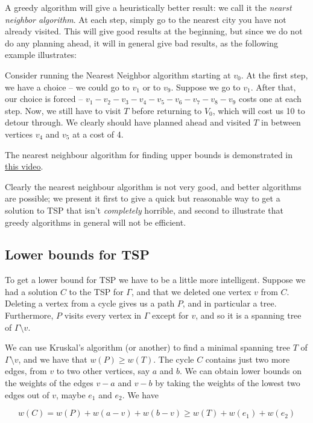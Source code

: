 \documentclass[]{article}
\begin{document}
A greedy algorithm will give a heuristically better result: we call it
the \emph{nearst neighbor algorithm}. At each step, simply go to the
nearest city you have not already visited. This will give good results
at the beginning, but since we do not do any planning ahead, it will in
general give bad results, as the following example illustrates:

Consider running the Nearest Neighbor algorithm starting at \(v_0\). At
the first step, we have a choice -- we could go to \(v_1\) or to
\(v_9\). Suppose we go to \(v_1\). After that, our choice is forced --
\(v_1-v_2-v_3-v_4-v_5-v_6-v_7-v_8-v_9\) costs one at each step. Now, we
still have to visit \(T\) before returning to \(V_0\), which will cost
us 10 to detour through. We clearly should have planned ahead and
visited \(T\) in between vertices \(v_4\) and \(v_5\) at a cost of 4.

The nearest neighbour algorithm for finding upper bounds is demonstrated
in \href{https://www.youtube.com/watch?v=wRvQSLtRnz0}{this video}.

Clearly the nearest neighbour algorithm is not very good, and better
algorithms are possible; we present it first to give a quick but
reasonable way to get a solution to TSP that isn't \emph{completely}
horrible, and second to illustrate that greedy algorithms in general
will not be efficient.

\subsection{Lower bounds for TSP}\label{lower-bounds-for-tsp}

To get a lower bound for TSP we have to be a little more intelligent.
Suppose we had a solution \(C\) to the TSP for \(\Gamma\), and that we
deleted one vertex \(v\) from \(C\). Deleting a vertex from a cycle
gives us a path \(P\), and in particular a tree. Furthermore, \(P\)
visits every vertex in \(\Gamma\) except for \(v\), and so it is a
spanning tree of \(\Gamma\setminus v\).

We can use Kruskal's algorithm (or another) to find a minimal spanning
tree \(T\) of \(\Gamma\setminus v\), and we have that \(w(P)\geq w(T)\).
The cycle \(C\) contains just two more edges, from \(v\) to two other
vertices, say \(a\) and \(b\). We can obtain lower bounds on the weights
of the edges \(v-a\) and \(v-b\) by taking the weights of the lowest two
edges out of \(v\), maybe \(e_1\) and \(e_2\). We have

\[w(C)=w(P)+w(a-v)+w(b-v)\geq w(T)+w(e_1)+w(e_2)\]
\end{document}
